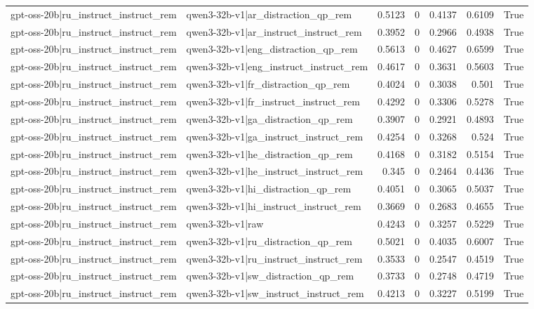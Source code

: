 \begin{table}
\begin{tabular}{l l r r r r l}
gpt-oss-20b|ru_instruct_instruct_rem & qwen3-32b-v1|ar_distraction_qp_rem & 0.5123 & 0 & 0.4137 & 0.6109 & True \\
gpt-oss-20b|ru_instruct_instruct_rem & qwen3-32b-v1|ar_instruct_instruct_rem & 0.3952 & 0 & 0.2966 & 0.4938 & True \\
gpt-oss-20b|ru_instruct_instruct_rem & qwen3-32b-v1|eng_distraction_qp_rem & 0.5613 & 0 & 0.4627 & 0.6599 & True \\
gpt-oss-20b|ru_instruct_instruct_rem & qwen3-32b-v1|eng_instruct_instruct_rem & 0.4617 & 0 & 0.3631 & 0.5603 & True \\
gpt-oss-20b|ru_instruct_instruct_rem & qwen3-32b-v1|fr_distraction_qp_rem & 0.4024 & 0 & 0.3038 & 0.501 & True \\
gpt-oss-20b|ru_instruct_instruct_rem & qwen3-32b-v1|fr_instruct_instruct_rem & 0.4292 & 0 & 0.3306 & 0.5278 & True \\
gpt-oss-20b|ru_instruct_instruct_rem & qwen3-32b-v1|ga_distraction_qp_rem & 0.3907 & 0 & 0.2921 & 0.4893 & True \\
gpt-oss-20b|ru_instruct_instruct_rem & qwen3-32b-v1|ga_instruct_instruct_rem & 0.4254 & 0 & 0.3268 & 0.524 & True \\
gpt-oss-20b|ru_instruct_instruct_rem & qwen3-32b-v1|he_distraction_qp_rem & 0.4168 & 0 & 0.3182 & 0.5154 & True \\
gpt-oss-20b|ru_instruct_instruct_rem & qwen3-32b-v1|he_instruct_instruct_rem & 0.345 & 0 & 0.2464 & 0.4436 & True \\
gpt-oss-20b|ru_instruct_instruct_rem & qwen3-32b-v1|hi_distraction_qp_rem & 0.4051 & 0 & 0.3065 & 0.5037 & True \\
gpt-oss-20b|ru_instruct_instruct_rem & qwen3-32b-v1|hi_instruct_instruct_rem & 0.3669 & 0 & 0.2683 & 0.4655 & True \\
gpt-oss-20b|ru_instruct_instruct_rem & qwen3-32b-v1|raw & 0.4243 & 0 & 0.3257 & 0.5229 & True \\
gpt-oss-20b|ru_instruct_instruct_rem & qwen3-32b-v1|ru_distraction_qp_rem & 0.5021 & 0 & 0.4035 & 0.6007 & True \\
gpt-oss-20b|ru_instruct_instruct_rem & qwen3-32b-v1|ru_instruct_instruct_rem & 0.3533 & 0 & 0.2547 & 0.4519 & True \\
gpt-oss-20b|ru_instruct_instruct_rem & qwen3-32b-v1|sw_distraction_qp_rem & 0.3733 & 0 & 0.2748 & 0.4719 & True \\
gpt-oss-20b|ru_instruct_instruct_rem & qwen3-32b-v1|sw_instruct_instruct_rem & 0.4213 & 0 & 0.3227 & 0.5199 & True \\

\end{tabular}
\end{table}
